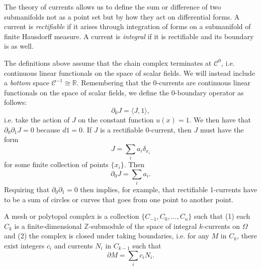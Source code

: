 \documentclass[twocolumn]{article}
\begin{document}
The theory of currents allows us to define the sum or difference of two submanifolds not as a point set but by how they act on differential forms.
A current is \emph{rectifiable} if it arises through integration of forms on a submanifold of finite Hausdorff measure.
A current is \emph{integral} if it is rectifiable and its boundary is as well.

The definitions above assume that the chain complex terminates at $\mathscr{C}^0$, i.e. continuous linear functionals on the space of scalar fields.
We will instead include a \emph{bottom} space $\mathscr{C}^{-1} \cong \mathbb{R}$.
Remembering that the 0-currents are continuous linear functionals on the space of scalar fields, we define the 0-boundary operator as follows:
\begin{equation}
    \partial_0 J = \langle J, 1\rangle,
    \label{eq:0-boundary-operator}
\end{equation}
i.e. take the action of $J$ on the constant function $u(x) = 1$.
We then have that $\partial_0\partial_1J = 0$ because $d1 = 0$.
If $J$ is a rectifiable 0-current, then $J$ must have the form
\begin{equation}
    J = \sum_ia_i\delta_{x_i}
\end{equation}
for some finite collection of points $\{x_i\}$.
Then
\begin{equation}
    \partial_0J = \sum_i a_i.
\end{equation}
Requiring that $\partial_0\partial_1 = 0$ then implies, for example, that rectifiable 1-currents have to be a sum of circles or curves that goes from one point to another point.

A mesh or polytopal complex is a collection $\{C_{-1}, C_0, \ldots, C_n\}$ such that (1) each $C_k$ is a finite-dimensional $\mathbb{Z}$-submodule of the space of integral $k$-currents on $\Omega$ and (2) the complex is closed under taking boundaries, i.e. for any $M$ in $C_k$, there exist integers $c_i$ and currents $N_i$ in $C_{k - 1}$ such that
\begin{equation}
    \partial M = \sum_ic_iN_i.
\end{equation}


\end{document}
